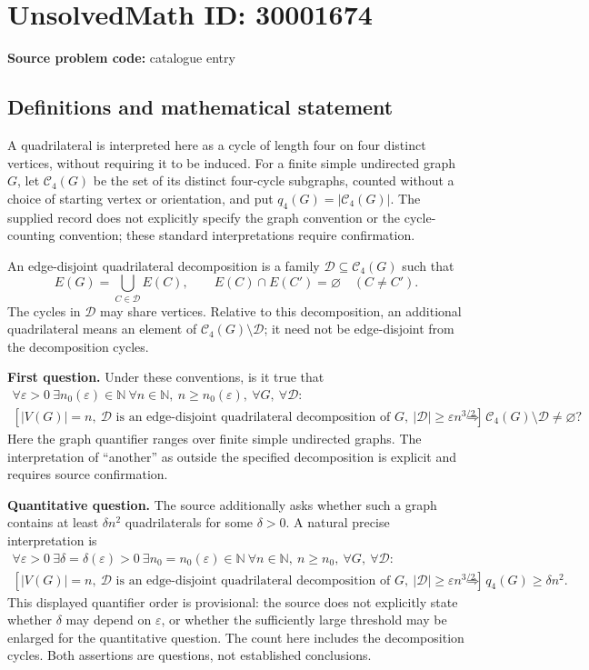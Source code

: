 \documentclass[11pt]{article}
\newcommand{\N}{\mathbb{N}}
\begin{document}
\section*{UnsolvedMath ID: 30001674}
\textbf{Source problem code:} catalogue entry
\subsection{Definitions and mathematical statement}
A quadrilateral is interpreted here as a cycle of length four on four distinct vertices, without requiring it to be induced. For a finite simple undirected graph \(G\), let \(\mathcal C_4(G)\) be the set of its distinct four-cycle subgraphs, counted without a choice of starting vertex or orientation, and put \(q_4(G)=|\mathcal C_4(G)|\). The supplied record does not explicitly specify the graph convention or the cycle-counting convention; these standard interpretations require confirmation.

An edge-disjoint quadrilateral decomposition is a family \(\mathcal D\subseteq\mathcal C_4(G)\) such that
\[
E(G)=\bigcup_{C\in\mathcal D}E(C),\qquad
E(C)\cap E(C')=\varnothing\quad(C\ne C').
\]
The cycles in \(\mathcal D\) may share vertices. Relative to this decomposition, an additional quadrilateral means an element of \(\mathcal C_4(G)\setminus\mathcal D\); it need not be edge-disjoint from the decomposition cycles.

\textbf{First question.} Under these conventions, is it true that
\[
\begin{gathered}
\forall\varepsilon>0\ \exists n_0(\varepsilon)\in\N\ 
\forall n\in\N,\ n\ge n_0(\varepsilon),\ 
\forall G,\ \forall\mathcal D:\\
\left[|V(G)|=n,\ \mathcal D\text{ is an edge-disjoint quadrilateral decomposition of }G,
\ |\mathcal D|\ge\varepsilon n^{3/2}\right]
\ \Longrightarrow\ 
\mathcal C_4(G)\setminus\mathcal D\ne\varnothing?
\end{gathered}
\]
Here the graph quantifier ranges over finite simple undirected graphs. The interpretation of ``another'' as outside the specified decomposition is explicit and requires source confirmation.

\textbf{Quantitative question.} The source additionally asks whether such a graph contains at least \(\delta n^2\) quadrilaterals for some \(\delta>0\). A natural precise interpretation is
\[
\begin{gathered}
\forall\varepsilon>0\ \exists\delta=\delta(\varepsilon)>0\ 
\exists n_0=n_0(\varepsilon)\in\N\ 
\forall n\in\N,\ n\ge n_0,\ \forall G,\ \forall\mathcal D:\\
\left[|V(G)|=n,\ \mathcal D\text{ is an edge-disjoint quadrilateral decomposition of }G,
\ |\mathcal D|\ge\varepsilon n^{3/2}\right]
\ \Longrightarrow\ q_4(G)\ge\delta n^2.
\end{gathered}
\]
This displayed quantifier order is provisional: the source does not explicitly state whether \(\delta\) may depend on \(\varepsilon\), or whether the sufficiently large threshold may be enlarged for the quantitative question. The count here includes the decomposition cycles. Both assertions are questions, not established conclusions.
\end{document}
